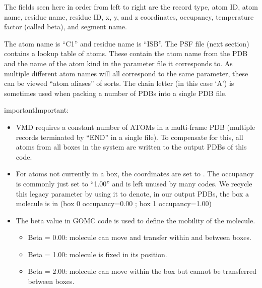 \documentclass[letterpaper,10pt,english]{sphinxmanual}
\begin{document}
The fields seen here in order from left to right are the record type, atom ID, atom name, residue name, residue ID, x, y, and z coordinates, occupancy, temperature factor (called beta), and segment name.

The atom name is “C1” and residue name is “ISB”. The PSF file (next section) contains a lookup table of atoms. These contain the atom name from the PDB and the name of the atom kind in the parameter file it corresponds to. As multiple different atom names will all correspond to the same parameter, these can be viewed “atom aliases” of sorts. The chain letter (in this case ‘A’) is sometimes used when packing a number of PDBs into a single PDB file.

\begin{sphinxadmonition}{important}{Important:}\begin{itemize}
\item {} 
VMD requires a constant number of ATOMs in a multi-frame PDB (multiple records terminated by “END” in a single file). To compensate for this, all atoms from all boxes in the system are written to the output PDBs of this code.

\item {} 
For atoms not currently in a box, the coordinates are set to . The occupancy is commonly just set to “1.00” and is left unused by many codes. We recycle this legacy parameter by using it to denote, in our output PDBs, the box a molecule is in (box 0 occupancy=0.00 ; box 1 occupancy=1.00)

\item {} 
The beta value in GOMC code is used to define the mobility of the molecule.
\begin{itemize}
\item {} 
Beta = 0.00: molecule can move and transfer within and between boxes.

\item {} 
Beta = 1.00: molecule is fixed in its position.

\item {} 
Beta = 2.00: molecule can move within the box but cannot be transferred between boxes.

\end{itemize}

\end{itemize}
\end{sphinxadmonition}
\end{document}

